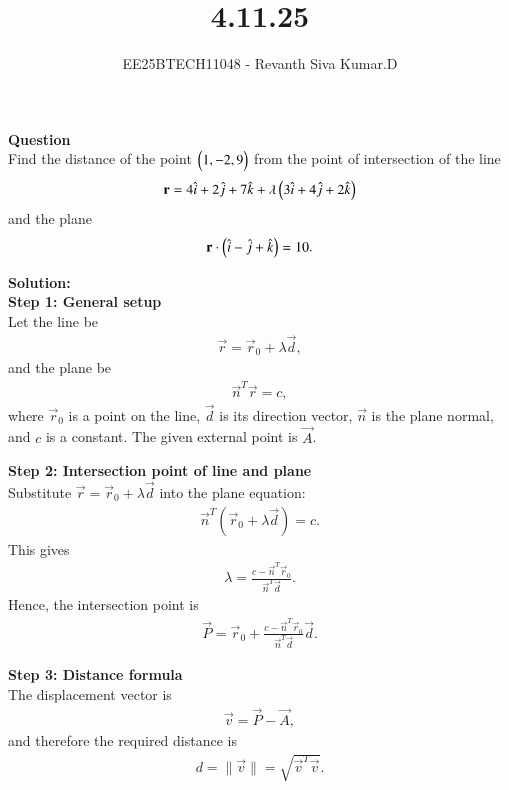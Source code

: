 \documentclass[journal]{IEEEtran}
\begin{document}

\vspace{3cm}

\title{4.11.25}
\author{EE25BTECH11048 - Revanth Siva Kumar.D}
{\let\newpage\relax\maketitle}

\textbf{Question} \\
Find the distance of the point $\begin{pmatrix}1,-2,9\end{pmatrix}$ from the point of intersection of the line
\[
\mathbf{r} = 4\hat{i} + 2\hat{j} + 7\hat{k} + \lambda \begin{pmatrix}3\hat{i} + 4\hat{j} + 2\hat{k}\end{pmatrix}
\]
and the plane
\[
\mathbf{r}\cdot\begin{pmatrix}\hat{i} - \hat{j} + \hat{k}\end{pmatrix} = 10.
\]

\textbf{Solution:} \\

\textbf{Step 1: General setup} \\
Let the line be
\begin{align}
    \vec{r} = \vec{r}_0 + \lambda \vec{d},
\end{align}
and the plane be
\begin{align}
    \vec{n}^T \vec{r} = c,
\end{align}
where $\vec{r}_0$ is a point on the line, $\vec{d}$ is its direction vector, $\vec{n}$ is the plane normal, and $c$ is a constant.  
The given external point is $\vec{A}$.

\textbf{Step 2: Intersection point of line and plane} \\
Substitute $\vec{r}=\vec{r}_0+\lambda\vec{d}$ into the plane equation:
\begin{align}
    \vec{n}^T(\vec{r}_0+\lambda \vec{d}) = c.
\end{align}
This gives
\begin{align}
    \lambda = \frac{c - \vec{n}^T\vec{r}_0}{\vec{n}^T \vec{d}}.
\end{align}
Hence, the intersection point is
\begin{align}
    \vec{P} = \vec{r}_0 + \frac{c - \vec{n}^T\vec{r}_0}{\vec{n}^T\vec{d}} \vec{d}.
\end{align}

\textbf{Step 3: Distance formula} \\
The displacement vector is
\begin{align}
    \vec{v} = \vec{P} - \vec{A},
\end{align}
and therefore the required distance is
\begin{align}
    d = \|\vec{v}\| = \sqrt{\vec{v}^T\vec{v}}.
\end{align}
\end{document}
